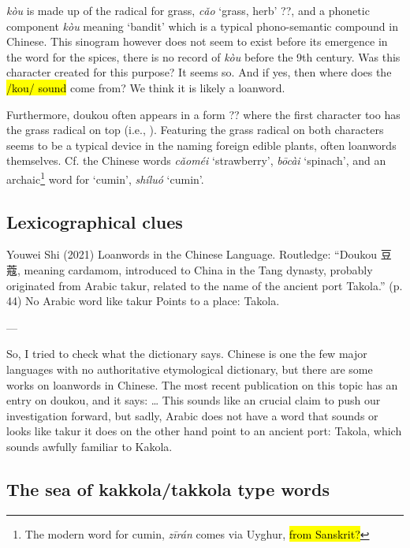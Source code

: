 \documentclass[12pt]{article}
\newcommand{\tc}[1]{\traditionalchinesefont{#1}\rmfamily}
\begin{document}
\tc{蔻} \textit{kòu} is made up of the radical for grass, \tc{艹} \textit{cǎo} `grass, herb' ??, and a phonetic component \tc{寇} \textit{kòu} meaning `bandit' which is a typical phono-semantic compound in Chinese. This sinogram however does not seem to exist before its emergence in the word for the spices, there is no record of \tc{蔻} \textit{kòu} before the 9th century. Was this character created for this purpose? It seems so. And if yes, then where does the \hl{/kou/ sound} come from? We think it is likely a loanword.

Furthermore, doukou often appears in a form ?? where the first character too has the grass radical on top (i.e., \tc{荳蔻}). Featuring the grass radical on both characters seems to be a typical device in the naming foreign edible plants, often loanwords themselves. Cf. the Chinese words \tc{草莓} \textit{cǎoméi} `strawberry', \tc{菠菜} \textit{bōcài} `spinach', and an archaic\footnote{The modern word for cumin, \tc{孜然} \textit{zī​rán} comes via Uyghur, \hl{from Sanskrit?}} word for `cumin', \tc{蒔蘿} \textit{shíluó} `cumin'.

\subsection{Lexicographical clues}

Youwei Shi (2021) Loanwords in the Chinese Language. Routledge:
	“Doukou 豆蔻, meaning cardamom, introduced to China in the 	Tang dynasty, probably originated from Arabic takur, related to 	the name of the ancient port Takola.” (p. 44)
No Arabic word like takur
Points to a place: Takola.

---

So, I tried to check what the dictionary says. Chinese is one the few major languages with no authoritative etymological dictionary, but there are some works on loanwords in Chinese. The most recent publication on this topic has an entry on doukou, and it says: 
…
This sounds like an crucial claim to push our investigation forward, 
but sadly, Arabic does not have a word that sounds or looks like takur
it does on the other hand point to an ancient port: Takola, which sounds awfully familiar to Kakola.





\subsection{The sea of kakkola/takkola type words}
\end{document}
